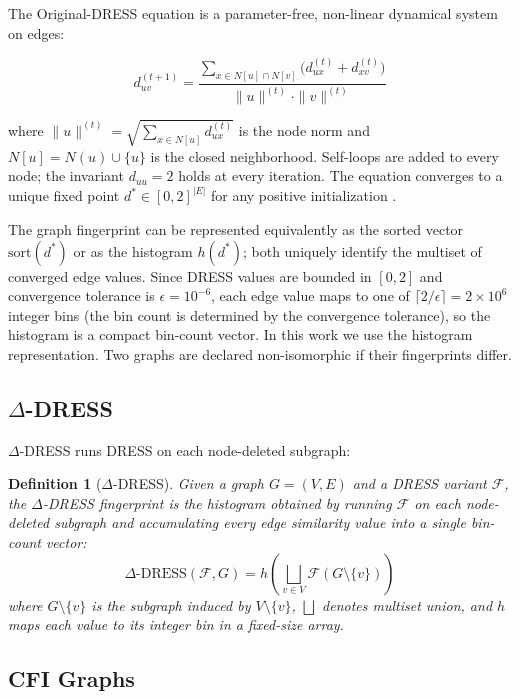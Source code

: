 \documentclass[11pt,a4paper]{article}
\newtheorem{definition}[theorem]{Definition}
\begin{document}
The Original-DRESS equation \cite{castrillo2018dynamicstructuralsimilaritygraphs} is a parameter-free, non-linear dynamical system on edges:

\begin{equation}
d_{uv}^{(t+1)} = \frac{\sum_{x \in N[u] \cap N[v]} \bigl(d_{ux}^{(t)} + d_{xv}^{(t)}\bigr)}{\|u\|^{(t)} \cdot \|v\|^{(t)}}
\end{equation}

where $\|u\|^{(t)} = \sqrt{\sum_{x \in N[u]} d_{ux}^{(t)}}$ is the node norm and $N[u] = N(u) \cup \{u\}$ is the closed neighborhood. Self-loops are added to every node; the invariant $d_{uu} = 2$ holds at every iteration. The equation converges to a unique fixed point $d^* \in [0, 2]^{|E|}$ for any positive initialization \cite{castrillo2026dress}.

The graph fingerprint can be represented equivalently as the sorted vector $\text{sort}(d^*)$ or as the histogram $h(d^*)$; both uniquely identify the multiset of converged edge values. Since DRESS values are bounded in $[0, 2]$ and convergence tolerance is $\epsilon = 10^{-6}$, each edge value maps to one of $\lceil 2/\epsilon \rceil = 2 \times 10^{6}$ integer bins (the bin count is determined by the convergence tolerance), so the histogram is a compact bin-count vector. In this work we use the histogram representation. Two graphs are declared non-isomorphic if their fingerprints differ.

\subsection{\texorpdfstring{$\Delta$}{Delta}-DRESS}

$\Delta$-DRESS \cite{castrillo2026dress} runs DRESS on each node-deleted subgraph:

\begin{definition}[$\Delta$-DRESS]
Given a graph $G = (V, E)$ and a DRESS variant $\mathcal{F}$, the $\Delta$-DRESS fingerprint is the histogram obtained by running $\mathcal{F}$ on each node-deleted subgraph and accumulating every edge similarity value into a single bin-count vector:
\[
\Delta\text{-DRESS}(\mathcal{F}, G) = h\!\left(\bigsqcup_{v \in V} \mathcal{F}(G \setminus \{v\})\right)
\]
where $G \setminus \{v\}$ is the subgraph induced by $V \setminus \{v\}$, $\bigsqcup$ denotes multiset union, and $h$ maps each value to its integer bin in a fixed-size array.
\end{definition}

\subsection{CFI Graphs}
\end{document}
